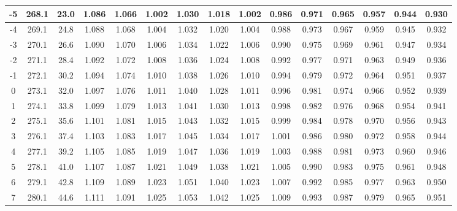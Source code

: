 \documentclass[12pt,a4paper,twoside]{article}
\begin{document}
\begin{center}
\begin{longtable}{ c c c | c c c c c c c c c c c c}
 -5 & 268.1 & 23.0 & 1.086 & 1.066 & 1.002 & 1.030 & 1.018 & 1.002 & 0.986 & 0.971 & 0.965 & 0.957 & 0.944 & 0.930 \\ \hline   
 
 -4 & 269.1 & 24.8 & 1.088 & 1.068 & 1.004 & 1.032 & 1.020 & 1.004 & 0.988 & 0.973 & 0.967 & 0.959 & 0.945 & 0.932 \\ \hline   
 
 -3 & 270.1 & 26.6 & 1.090 & 1.070 & 1.006 & 1.034 & 1.022 & 1.006 & 0.990 & 0.975 & 0.969 & 0.961 & 0.947 & 0.934 \\ \hline   
 
 -2 & 271.1 & 28.4 & 1.092 & 1.072 & 1.008 & 1.036 & 1.024 & 1.008 & 0.992 & 0.977 & 0.971 & 0.963 & 0.949 & 0.936 \\ \hline   
 
 -1 & 272.1 & 30.2 & 1.094 & 1.074 & 1.010 & 1.038 & 1.026 & 1.010 & 0.994 & 0.979 & 0.972 & 0.964 & 0.951 & 0.937 \\ \hline   
 
 0 & 273.1 & 32.0 & 1.097 & 1.076 & 1.011 & 1.040 & 1.028 & 1.011 & 0.996 & 0.981 & 0.974 & 0.966 & 0.952 & 0.939 \\ \hline   
 
 1 & 274.1 & 33.8 & 1.099 & 1.079 & 1.013 & 1.041 & 1.030 & 1.013 & 0.998 & 0.982 & 0.976 & 0.968 & 0.954 & 0.941 \\ \hline   
 
 2 & 275.1 & 35.6 & 1.101 & 1.081 & 1.015 & 1.043 & 1.032 & 1.015 & 0.999 & 0.984 & 0.978 & 0.970 & 0.956 & 0.943 \\ \hline   
 
 3 & 276.1 & 37.4 & 1.103 & 1.083 & 1.017 & 1.045 & 1.034 & 1.017 & 1.001 & 0.986 & 0.980 & 0.972 & 0.958 & 0.944 \\ \hline   
 
 4 & 277.1 & 39.2 & 1.105 & 1.085 & 1.019 & 1.047 & 1.036 & 1.019 & 1.003 & 0.988 & 0.981 & 0.973 & 0.960 & 0.946 \\ \hline   
 
 5 & 278.1 & 41.0 & 1.107 & 1.087 & 1.021 & 1.049 & 1.038 & 1.021 & 1.005 & 0.990 & 0.983 & 0.975 & 0.961 & 0.948 \\ \hline   
 
 6 & 279.1 & 42.8 & 1.109 & 1.089 & 1.023 & 1.051 & 1.040 & 1.023 & 1.007 & 0.992 & 0.985 & 0.977 & 0.963 & 0.950 \\ \hline   
 
 7 & 280.1 & 44.6 & 1.111 & 1.091 & 1.025 & 1.053 & 1.042 & 1.025 & 1.009 & 0.993 & 0.987 & 0.979 & 0.965 & 0.951 \\ \hline   
 

\end{longtable}
\end{center}
\end{document}
